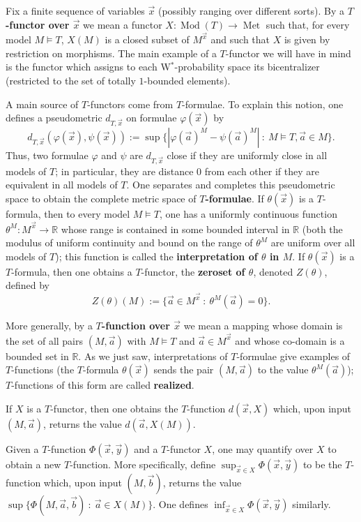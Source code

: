 \documentclass[12pt]{amsart}
\theoremstyle{definition}
\def\bb{\mathbb}
\def\bb{\mathbb}
\begin{document}
Fix a finite sequence of variables $\vec x$ (possibly ranging over different sorts).  By a \textbf{$T$-functor over $\vec x$} we mean a functor $X:\operatorname{Mod}(T)\to \operatorname{Met}$ such that, for every model $M\models T$, $X(M)$ is a closed subset of $M^{\vec x}$ and such that $X$ is given by restriction on morphisms.  The main example of a $T$-functor we will have in mind is the functor which assigns to each W$^*$-probability space its bicentralizer (restricted to the set of totally $1$-bounded elements).

A main source of $T$-functors come from $T$-formulae.  To explain this notion, one defines a pseudometric $d_{T,\vec x}$ on formulae $\varphi(\vec x)$ by $$d_{T,\vec x}(\varphi(\vec x),\psi(\vec x)):=\sup\{|\varphi(\vec a)^M-\psi(\vec a)^M| \ : \ M\models T, \vec a\in M\}.$$  Thus, two formulae $\varphi$ and $\psi$ are $d_{T,\vec x}$ close if they are uniformly close in all models of $T$; in particular, they are distance $0$ from each other if they are equivalent in all models of $T$.  One separates and completes this pseudometric space to obtain the complete metric space of \textbf{$T$-formulae}.  If $\theta(\vec x)$ is a $T$-formula, then to every model $M\models T$, one has a uniformly continuous function $\theta^M:M^{\vec x}\to \mathbb R$ whose range is contained in some bounded interval in $\bb R$ (both the modulus of uniform continuity and bound on the range of $\theta^M$ are uniform over all models of $T$); this function is called the \textbf{interpretation of $\theta$ in $M$}.  If $\theta(\vec x)$ is a $T$-formula, then one obtains a $T$-functor, the \textbf{zeroset of $\theta$}, denoted $Z(\theta)$, defined by $$Z(\theta)(M):=\{\vec a\in M^{\vec x} \ : \ \theta^M(\vec a)=0\}.$$

More generally, by a \textbf{$T$-function over $\vec x$} we mean a mapping whose domain is the set of all pairs $(M,\vec a)$ with $M\models T$ and $\vec a\in M^{\vec x}$ and whose co-domain is a bounded set in $\bb R$.  As we just saw, interpretations of $T$-formulae give examples of $T$-functions (the $T$-formula $\theta(\vec x)$ sends the pair $(M,\vec a)$ to the value $\theta^M(\vec a)$); $T$-functions of this form are called \textbf{realized}.

If $X$ is a $T$-functor, then one obtains the $T$-function $d(\vec x,X)$ which, upon input $(M,\vec a)$, returns the value $d(\vec a,X(M))$.

Given a $T$-function $\Phi(\vec x,\vec y)$ and a $T$-functor $X$, one may quantify over $X$ to obtain a new $T$-function.  More specifically, define $\sup_{\vec x\in X}\Phi(\vec x,\vec y)$ to be the $T$-function which, upon input $(M,\vec b)$, returns the value $\sup\{\Phi(M,\vec a,\vec b) \ : \ \vec a\in X(M)\}$.  One defines $\inf_{\vec x\in X}\Phi(\vec x,\vec y)$ similarly.
\end{document}
